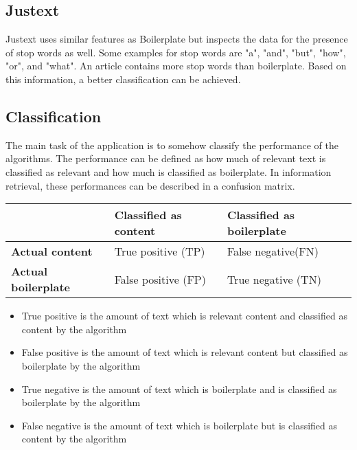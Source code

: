  \subsection{Justext}

Justext uses similar features as Boilerplate but inspects the data for the presence of stop words as well. Some examples for stop words are "a", "and", "but", "how", "or", and "what". An article contains more stop words than boilerplate. Based on this information, a better classification can be achieved.

\subsection{Classification}

The main task of the application is to somehow classify the performance of the algorithms. The performance can be defined as how much of relevant text is classified as relevant and how much is classified as boilerplate. In information retrieval, these performances can be described in a confusion matrix.

\begin{table}[h]
\begin{tabular}{|p{4cm} |p{5.5cm} |p{5.5cm} |}\hline
          								& \textbf{Classified as content} 	& \textbf{Classified as boilerplate} 	\\ \hline
\textbf{Actual content} 				& True positive (TP)				& False negative(FN)					\\ \hline
\textbf{Actual boilerplate} 			& False positive (FP)       		& True negative (TN)				 	\\ \hline
\end{tabular}
\end{table}

\begin{itemize}
\item True positive is the amount of text which is relevant content and classified as content by the algorithm
\item False positive is the amount of text which is relevant content but classified as boilerplate by the algorithm 
\item True negative is the amount of text which is boilerplate and is classified as boilerplate by the algorithm
\item False negative is the amount of text which is boilerplate but is classified as content by the algorithm
\end{itemize}

